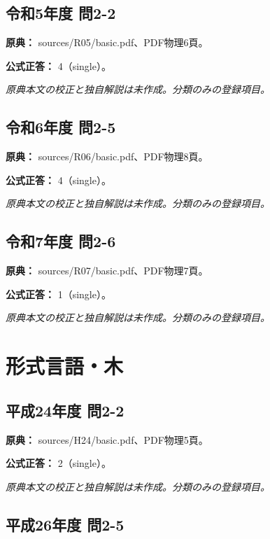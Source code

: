 \subsection{令和5年度 問2-2}
\label{q:r05-reg-basic-2-2}

\noindent\textbf{原典：} sources/R05/basic.pdf、PDF物理6頁。

\textbf{公式正答：} 4（single）。

\par\textit{原典本文の校正と独自解説は未作成。分類のみの登録項目。}

\subsection{令和6年度 問2-5}
\label{q:r06-reg-basic-2-5}

\noindent\textbf{原典：} sources/R06/basic.pdf、PDF物理8頁。

\textbf{公式正答：} 4（single）。

\par\textit{原典本文の校正と独自解説は未作成。分類のみの登録項目。}

\subsection{令和7年度 問2-6}
\label{q:r07-reg-basic-2-6}

\noindent\textbf{原典：} sources/R07/basic.pdf、PDF物理7頁。

\textbf{公式正答：} 1（single）。

\par\textit{原典本文の校正と独自解説は未作成。分類のみの登録項目。}

\section{形式言語・木}

\subsection{平成24年度 問2-2}
\label{q:h24-reg-basic-2-2}

\noindent\textbf{原典：} sources/H24/basic.pdf、PDF物理5頁。

\textbf{公式正答：} 2（single）。

\par\textit{原典本文の校正と独自解説は未作成。分類のみの登録項目。}

\subsection{平成26年度 問2-5}
\label{q:h26-reg-basic-2-5}

